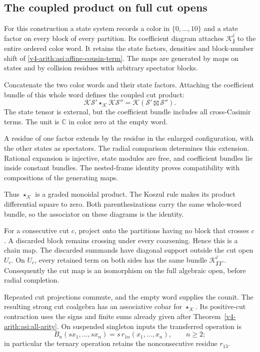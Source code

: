 \subsection{The coupled product on full cut opens}

For this construction a state system records a color in
\(\{0,\ldots,10\}\) and a state factor on every block of every
partition. Its coefficient diagram attaches
\(\mathcal K^l_{\mathbf j}\) to the entire ordered color word.
It retains the state factors, densities and block-number shift
of \eqref{v4-arith:asi:affine-cousin-term}.
The maps are generated by maps on states and by collision residues
with arbitrary spectator blocks.

Concatenate the two color words and their state factors.
Attaching the coefficient bundle of this whole word defines
the coupled cut product:
\begin{equation}\label{v4-arith:asi:coupled-product}
 \mathcal K\mathscr S'\star_{\mathcal K}\mathcal K\mathscr S''
     =\mathcal K(\mathscr S'\boxtimes\mathscr S'').
\end{equation}
The state tensor is external, but the coefficient bundle includes
all cross-Casimir terms. The unit is \(\mathbb C\) in color zero
at the empty word.

A residue of one factor extends by the residue in the enlarged
configuration, with the other states as spectators.
The radial comparison determines this extension.
Rational expansion is injective, state modules are free,
and coefficient bundles lie inside constant bundles.
The nested-frame identity proves compatibility with compositions
of the generating maps.

Thus \(\star_{\mathcal K}\) is a graded monoidal product. The Koszul rule makes its product differential
square to zero. Both parenthesizations carry the same
whole-word bundle, so the associator on these diagrams is the identity.

For a consecutive cut \(c\), project onto the partitions having no
block that crosses \(c\). A discarded block remains crossing
under every coarsening. Hence this is a chain map.
The discarded summands have diagonal support outside the cut open
\(U_c\). On \(U_c\), every retained term on both sides has the
same bundle \(\mathcal K^l_{\mathbf j'\mathbf j''}\).
Consequently the cut map is an isomorphism on the full algebraic
open, before radial completion.

Repeated cut projections commute, and the empty word supplies the
counit. The resulting strong cut coalgebra has an associative
cobar for \(\star_{\mathcal K}\).
Its positive-cut contraction uses the signs and finite sums already
given after Theorem~\ref{v4-arith:asi:all-arity}.
On suspended singleton inputs the transferred operation is
\[
 B_n(sx_1,\ldots,sx_n)=s\,r_{1n}(x_1,\ldots,x_n),\qquad n\ge2;
\]
in particular the ternary operation retains the
nonconsecutive residue \(r_{13}\).

